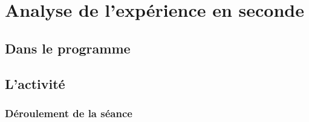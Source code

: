 \documentclass[12pt,a4paper]{article}
\begin{document}
\section{Analyse de l'expérience en seconde}

\subsection{Dans le programme}

\subsection{L'activité}

\subsubsection{Déroulement de la séance}
\end{document}
